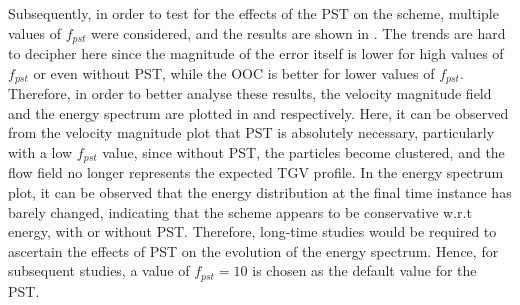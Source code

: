Subsequently, in order to test for the effects of the PST on the scheme, multiple values of $f_{pst}$ were considered, and the results are shown in .
The trends are hard to decipher here since the magnitude of the error itself is lower for high values of $f_{pst}$ or even without PST, while the OOC is better for lower values of $f_{pst}$.
Therefore, in order to better analyse these results, the velocity magnitude field and the energy spectrum are plotted in  and  respectively.
Here, it can be observed from the velocity magnitude plot that PST is absolutely necessary, particularly with a low $f_{pst}$ value, since without PST, the particles become clustered, and the flow field no longer represents the expected TGV profile.
In the energy spectrum plot, it can be observed that the energy distribution at the final time instance has barely changed, indicating that the scheme appears to be conservative w.r.t energy, with or without PST. Therefore, long-time studies would be required to ascertain the effects of PST on the evolution of the energy spectrum.
Hence, for subsequent studies, a value of $f_{pst} = 10$ is chosen as the default value for the PST.

